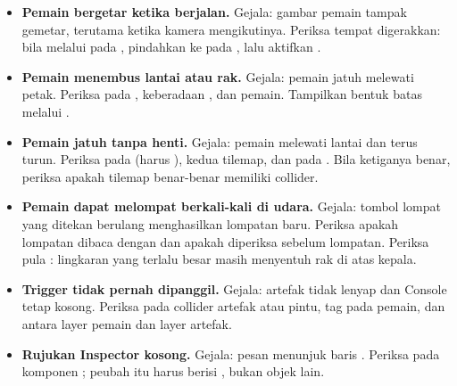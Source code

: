 

\begin{galatbox}
\begin{itemize}[leftmargin=1.4em, itemsep=0.35em]
  \item \textbf{Pemain bergetar ketika berjalan.}
        Gejala: gambar pemain tampak gemetar, terutama ketika kamera
        mengikutinya. Periksa tempat  digerakkan: bila
        melalui  pada , pindahkan ke
         pada , lalu aktifkan
        .
  \item \textbf{Pemain menembus lantai atau rak.}
        Gejala: pemain jatuh melewati petak. Periksa 
        pada , keberadaan , dan  pemain. Tampilkan bentuk batas
        melalui .
  \item \textbf{Pemain jatuh tanpa henti.}
        Gejala: pemain melewati lantai dan terus turun. Periksa
         pada  (harus ),
         kedua tilemap, dan  pada
        . Bila ketiganya benar, periksa
        apakah tilemap benar-benar memiliki collider.
  \item \textbf{Pemain dapat melompat berkali-kali di udara.}
        Gejala: tombol lompat yang ditekan berulang menghasilkan lompatan
        baru. Periksa apakah lompatan dibaca dengan
         dan apakah  diperiksa
        sebelum lompatan. Periksa pula : lingkaran yang
        terlalu besar masih menyentuh rak di atas kepala.
  \item \textbf{Trigger tidak pernah dipanggil.}
        Gejala: artefak tidak lenyap dan Console tetap kosong. Periksa
         pada collider artefak atau pintu, tag 
        pada pemain, dan  antara layer pemain
        dan layer artefak.
  \item \textbf{Rujukan Inspector kosong.}
        Gejala: pesan  menunjuk baris
        . Periksa  pada
        komponen ; peubah itu harus berisi
        , bukan objek lain.
\end{itemize}
\end{galatbox}

